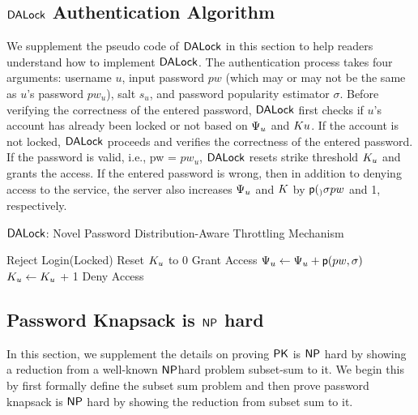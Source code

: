 
\appendix




\subsection{$\mathsf{DALock}$ Authentication Algorithm}
We supplement the pseudo code of $\mathsf{DALock}$ in this section to help readers understand how to implement $\mathsf{DALock}$. The authentication process takes four arguments: username $u$, input password $pw$ (which may or may not be the same as $u$’s password $pw_u$), salt $s_u$, and password popularity estimator $\sigma$. Before verifying the correctness of the entered password, $\mathsf{DALock}$ first checks if $u$'s account has already been locked or not based on $\Psi_{u}$ and $K{u}$. If the account is not locked, $\mathsf{DALock}$ proceeds and verifies the correctness of the entered password. If the password is valid, i.e., pw = $pw_u$, $\mathsf{DALock}$ resets strike threshold $K_{u}$ and grants the access. If the entered password is wrong, then in addition to denying access to the service, the server also increases $\Psi_{u}$ and $K$ by $\textsf{p}(_){\sigma}{pw}$ and 1, respectively.


\begin{algorithm}[!htb]
	\caption{\textbf{$\mathsf{DALock}$}: Novel Password Distribution-Aware Throttling Mechanism }\label{algorithm:DALock}
	\begin{algorithmic}[1]
		\State Reject Login(Locked)
		\EndIf
		\State Reset $K_{u}$ to 0
		\State Grant Access
		\Else
		\State $\Psi_{u} \leftarrow \Psi_{u} + \textsf{p}(pw,\sigma)$
		\State $K_{u} \leftarrow K_{u}$ + 1
		\State Deny Access
		\EndIf
		\EndFunction
	\end{algorithmic}
\end{algorithm} 
\vspace{-0.5cm}
\subsection{Password Knapsack is $\mathsf{NP}$ hard}\label{appendix:pkhardness}

In this section, we supplement the details on proving $\mathsf{PK}$ is $\mathsf{NP}$ hard by showing a reduction from a well-known $\mathsf{NP}$hard problem subset-sum to it. We begin this by first formally define the subset sum problem and then prove password knapsack is $\mathsf{NP}$ hard by showing the reduction from subset sum to it.

